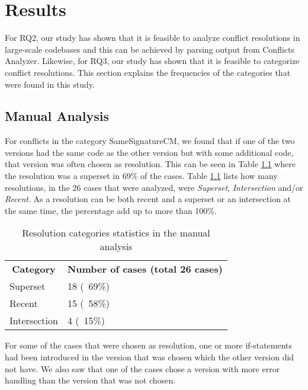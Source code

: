 \chapter{Results}
For RQ2, our study has shown that it is feasible to analyze conflict resolutions in large-scale codebases and this can be achieved by parsing output from Conflicts Analyzer. Likewise, for RQ3, our study has shown that it is feasible to categorize conflict resolutions. This section explains the frequencies of the categories that were found in this study.
\section{Manual Analysis}
For conflicts in the category SameSignatureCM, we found that if one of the two versions had the same code as the other version but with some additional code, that version was often chosen as resolution. This can be seen in Table \ref{table:rcsitma} where the resolution was a superset in 69\% of the cases. Table \ref{table:rcsitma} lists how many resolutions, in the 26 cases that were analyzed, were \textit{Superset}, \textit{Intersection} and/or \textit{Recent}. As a resolution can be both recent and a superset or an intersection at the same time, the percentage add up to more than 100\%.
\begin{table}
\caption{Resolution categories statistics in the manual analysis}\label{table:rcsitma}
\begin{tabular}{ p{6cm} p{6cm} }
\hline
\multicolumn{1}{c}{\textbf{Category}} & \multicolumn{1}{c}{\textbf{Number of cases (total 26 cases)}}\\
Superset & 18 (~69\%)\\
Recent & 15 (~58\%)\\
Intersection & 4 (~15\%)\\
\end{tabular}
\end{table}
\FloatBarrier
For some of the cases that were chosen as resolution, one or more if-statements had been introduced in the version that was chosen which the other version did not have. We also saw that one of the cases chose a version with more error handling than the version that was not chosen.

